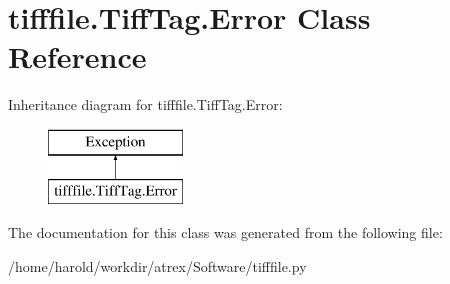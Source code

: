 \hypertarget{classtifffile_1_1TiffTag_1_1Error}{\section{tifffile.\-Tiff\-Tag.\-Error Class Reference}
\label{classtifffile_1_1TiffTag_1_1Error}
}
Inheritance diagram for tifffile.\-Tiff\-Tag.\-Error\-:\begin{figure}[H]
\begin{center}
\leavevmode
\includegraphics[height=2.000000cm]{classtifffile_1_1TiffTag_1_1Error}
\end{center}
\end{figure}


The documentation for this class was generated from the following file\-:\begin{DoxyCompactItemize}
\item 
/home/harold/workdir/atrex/\-Software/tifffile.\-py\end{DoxyCompactItemize}
